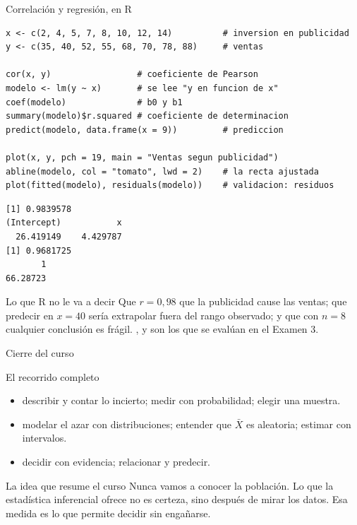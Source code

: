 \documentclass[aspectratio=169,10pt]{beamer}
\begin{document}
\begin{frame}[fragile]{Correlación y regresión, en R}
  \scriptsize
\begin{lstlisting}[style=Rmini]
x <- c(2, 4, 5, 7, 8, 10, 12, 14)          # inversion en publicidad
y <- c(35, 40, 52, 55, 68, 70, 78, 88)     # ventas

cor(x, y)                 # coeficiente de Pearson
modelo <- lm(y ~ x)       # se lee "y en funcion de x"
coef(modelo)              # b0 y b1
summary(modelo)$r.squared # coeficiente de determinacion
predict(modelo, data.frame(x = 9))         # prediccion

plot(x, y, pch = 19, main = "Ventas segun publicidad")
abline(modelo, col = "tomato", lwd = 2)    # la recta ajustada
plot(fitted(modelo), residuals(modelo))    # validacion: residuos
\end{lstlisting}
\begin{lstlisting}[style=Rout]
[1] 0.9839578
(Intercept)           x
  26.419149    4.429787
[1] 0.9681725
       1
66.28723
\end{lstlisting}

  \vspace{-0.12cm}
  \begin{alertblock}{Lo que R no le va a decir}
    \tiny
    Que $r = 0{,}98$  que la publicidad cause las ventas;
    que predecir en $x = 40$ sería extrapolar fuera del rango observado; y que
    con $n = 8$ cualquier conclusión es frágil. , y son los que se evalúan en el Examen 3.
  \end{alertblock}
\end{frame}

\begin{frame}{Cierre del curso}
  \begin{block}{El recorrido completo}
    \footnotesize
    \begin{itemize}
      \item {} describir y contar lo incierto; medir con
            probabilidad; elegir una muestra.
      \item {} modelar el azar con distribuciones; entender que
            $\bar X$ es aleatoria; estimar con intervalos.
      \item {} decidir con evidencia; relacionar y predecir.
    \end{itemize}
  \end{block}

  \vspace{0.2cm}
  \begin{alertblock}{La idea que resume el curso}
    \footnotesize
    Nunca vamos a conocer la población. Lo que la estadística inferencial
    ofrece no es certeza, sino  después de mirar los datos. Esa medida es lo que
    permite decidir sin engañarse.
  \end{alertblock}
\end{frame}
\end{document}
